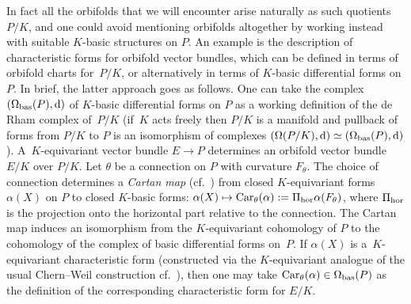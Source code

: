 \documentclass[pdftex]{sigma}
\numberwithin{equation}{section}
\newcommand{\tn}[1]{\textnormal{#1}}
\begin{document}
In fact all the orbifolds that we will encounter arise naturally as such quotients $P/K$, and one could avoid mentioning orbifolds altogether by working instead with suitable $K$-basic structures on $P$. An example is the description of characteristic forms for orbifold vector bundles, which can be defined in terms of orbifold charts for~$P/K$, or alternatively in terms of $K$-basic differential forms on $P$. In brief, the latter approach goes as follows. One can take the complex $(\Omega_{\tn{bas}}(P),{\rm d})$ of $K$-basic differential forms on $P$ as a working definition of the de Rham complex of~$P/K$ (if~$K$ acts freely then $P/K$ is a manifold and pullback of forms from $P/K$ to $P$ is an isomorphism of complexes $(\Omega(P/K),{\rm d})\simeq (\Omega_{\tn{bas}}(P),{\rm d})$). A~$K$-equivariant vector bundle $E \rightarrow P$ determines an orbifold vector bundle $E/K$ over $P/K$. Let $\theta$ be a connection on $P$ with curvature $F_\theta$. The choice of connection determines a \emph{Cartan map} (cf.~\cite{MeinrenkenEncyclopedia}) from closed $K$-equivariant forms $\alpha(X)$ on $P$ to closed $K$-basic forms: $\alpha(X) \mapsto \tn{Car}_\theta(\alpha):=\Pi_{\tn{hor}}\alpha(F_\theta)$, where $\Pi_{\tn{hor}}$ is the projection onto the horizontal part relative to the connection. The Cartan map induces an isomorphism from the $K$-equivariant cohomology of $P$ to the cohomology of the complex of basic differential forms on~$P$. If $\alpha(X)$ is a~$K$-equivariant characteristic form (constructed via the $K$-equivariant analogue of the usual Chern--Weil construction cf.~\cite{BerlineGetzlerVergne,MeinrenkenEncyclopedia}), then one may take $\tn{Car}_\theta(\alpha) \in \Omega_{\tn{bas}}(P)$ as the definition of the corresponding characteristic form for $E/K$.
\end{document}
